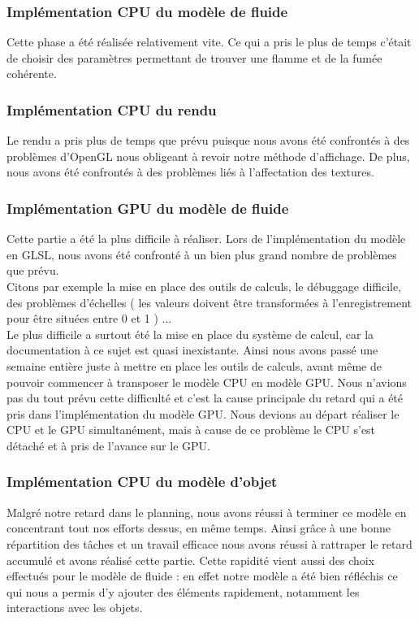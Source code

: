 \documentclass[a4paper,10pt]{article}
\begin{document}
\subsubsection{Implémentation CPU du modèle de fluide}
Cette phase a été réalisée relativement vite. Ce qui a pris le plus de temps c'était de choisir des paramètres
permettant de trouver une flamme et de la fumée cohérente.

\subsubsection{Implémentation CPU du rendu}
Le rendu a pris plus de temps que prévu puisque nous avons été confrontés à des problèmes d'OpenGL nous obligeant à revoir 
notre méthode d'affichage. De plus, nous avons été confrontés à des problèmes liés à l'affectation des textures. 


\subsubsection{Implémentation GPU du modèle de fluide}
Cette partie a été la plus difficile à réaliser. Lors de l'implémentation du modèle en GLSL, nous avons été
confronté à un bien plus grand nombre de problèmes que prévu. \\
Citons par exemple la mise en place des outils de calculs, le débuggage difficile, des problèmes d'échelles ( les valeurs doivent être transformées à l'enregistrement pour être situées entre 0 et 1 ) ...\\
Le plus difficile a surtout été la mise en place du système de calcul, car la documentation à ce sujet est quasi inexistante. Ainsi nous avons passé une semaine entière juste à mettre en place les outils de calculs, avant même de pouvoir commencer à transposer le modèle CPU en modèle GPU. Nous n'avions pas du tout prévu cette difficulté et c'est la cause principale du retard qui a été pris dans l'implémentation du modèle GPU. Nous devions au départ réaliser le CPU et le GPU simultanément,
mais à cause de ce problème le CPU s'est détaché et à pris de l'avance sur le GPU.



\subsubsection{Implémentation CPU du modèle d'objet}
Malgré notre retard dans le planning, nous avons réussi à terminer ce modèle en concentrant tout nos
efforts dessus, en même temps. Ainsi grâce à une bonne répartition des tâches et
un travail efficace nous avons réussi à rattraper le retard accumulé et avons réalisé
cette partie. Cette rapidité vient aussi des choix effectués pour le modèle de fluide :
en effet notre modèle a été bien réfléchis ce qui nous a permis d'y ajouter des éléments
rapidement, notamment les interactions avec les objets.
\end{document}
